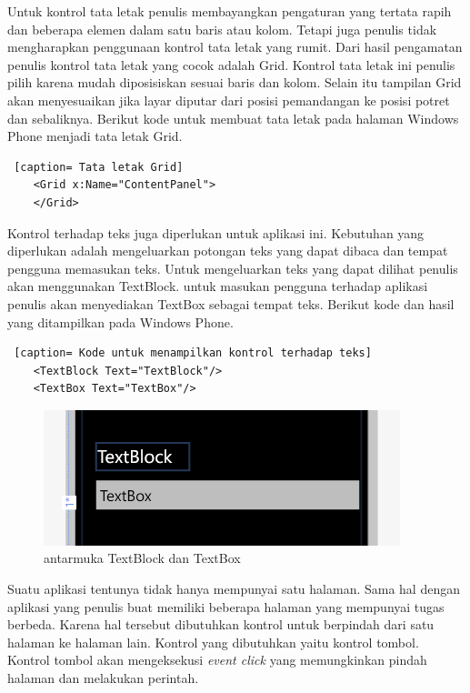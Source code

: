 \hspace{0.5cm} Untuk kontrol tata letak penulis membayangkan pengaturan yang tertata rapih dan beberapa elemen dalam satu baris atau kolom. Tetapi juga penulis tidak mengharapkan penggunaan kontrol tata letak yang rumit. Dari hasil pengamatan penulis kontrol tata letak yang cocok adalah Grid. Kontrol tata letak ini penulis pilih karena mudah diposisiskan sesuai baris dan kolom. Selain itu tampilan Grid akan menyesuaikan jika layar diputar dari posisi pemandangan ke posisi potret dan sebaliknya. Berikut kode untuk membuat tata letak pada halaman Windows Phone menjadi tata letak Grid.

\begin{lstlisting} [caption= Tata letak Grid]
	<Grid x:Name="ContentPanel">
	</Grid>
\end{lstlisting}

\hspace{0.5cm} Kontrol terhadap teks juga diperlukan untuk aplikasi ini. Kebutuhan yang diperlukan adalah mengeluarkan potongan teks yang dapat dibaca dan tempat pengguna memasukan teks. Untuk mengeluarkan teks yang dapat dilihat penulis akan menggunakan TextBlock. untuk masukan pengguna terhadap aplikasi penulis akan menyediakan TextBox sebagai tempat teks. Berikut kode dan hasil yang ditampilkan pada Windows Phone.

\begin{lstlisting} [caption= Kode untuk menampilkan kontrol terhadap teks]
	<TextBlock Text="TextBlock"/>
	<TextBox Text="TextBox"/>
\end{lstlisting}

\begin{figure}[h]
	\centering
		\includegraphics[scale=0.5]{Gambar/kontrol/control_text.PNG}
	\caption{antarmuka TextBlock dan TextBox}
	\label{fig:antarmuka TextBlock dan TextBox}
\end{figure}

\hspace{0.5cm} Suatu aplikasi tentunya tidak hanya mempunyai satu halaman. Sama hal dengan aplikasi yang penulis buat memiliki beberapa halaman yang mempunyai tugas berbeda. Karena hal tersebut dibutuhkan kontrol untuk berpindah dari satu halaman ke halaman lain. Kontrol yang dibutuhkan yaitu kontrol tombol. Kontrol tombol akan mengeksekusi \textit{event click} yang memungkinkan pindah halaman dan melakukan perintah.  

